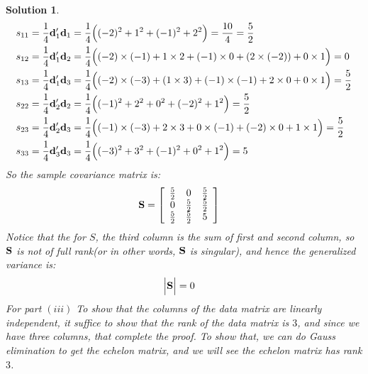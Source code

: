 \documentclass[11pt]{article}
\newtheorem{sol}{Solution}
\begin{document}
\begin{sol}
	\begin{align*}
		s_{11} &=\frac{1}{4}{\bf d}_1'{\bf d}_1 =  \frac{1}{4}\Big((-2)^2 + 1^2 + (-1)^2 + 2^2\Big) = \frac{10}{4} = \frac{5}{2}\\
		s_{12} &= \frac{1}{4}{\bf d}_1'{\bf d}_2 = \frac{1}{4}\Big((-2)\times (-1) + 1 \times 2 + (-1)\times 0 + (2\times (-2)) + 0 \times 1\Big) = 0\\
		s_{13} &= \frac{1}{4}{\bf d}_1'{\bf d}_3 = \frac{1}{4}\Big((-2)\times(-3)+ (1\times 3)+ (-1)\times (-1) + 2\times 0 + 0 \times 1\Big) = \frac{5}{2}\\
		s_{22} &= \frac{1}{4}{\bf d}_2'{\bf d}_2 =  \frac{1}{4}\Big((-1)^2+ 2^2 + 0^2 + (-2)^2+ 1^2\Big) = \frac{5}{2}\\
		s_{23} &= \frac{1}{4}{\bf d}_2'{\bf d}_3 = \frac{1}{4}\Big((-1)\times(-3) + 2\times 3 + 0\times(-1) + (-2)\times 0 + 1 \times 1\Big) = \frac{5}{2}\\
		s_{33} &= \frac{1}{4}{\bf d}_3'{\bf d}_3 = \frac{1}{4}\Big((-3)^2 + 3^2 + (-1)^2 + 0^2 + 1^2\Big) = 5
	\end{align*}
	So the sample covariance matrix is:
	\begin{align*}
		{\bf S} &= \left[\begin{array}{ccc}\frac{5}{2}&0&\frac{5}{2}\\ 0&\frac{5}{2}&\frac{5}{2}\\\frac{5}{2} &\frac{5}{2}&5\end{array}\right]
	\end{align*}
	Notice that the for $S$, the third column is the sum of first and second column, so ${\bf S}$ is not of full rank(or in other words, ${\bf S}$ is singular), and hence the generalized variance is:
	\begin{align*}
		\Big|{\bf S}\Big| &= 0
	\end{align*}
	For part $(iii)$\vskip 2mm
	To show that the columns of the data matrix are linearly independent, it suffice to show that the rank of the data matrix is $3$, and since we have three columns, that complete the proof.\vskip 2mm
	To show that, we can do Gauss elimination to get the echelon matrix, and we will see the echelon matrix has rank $3$.
	\begin{align*}

\end{align*}
\end{sol}
\end{document}
